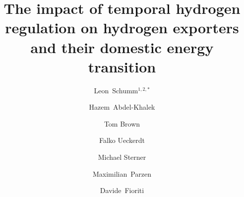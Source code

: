 \documentclass[5p,numafflabel]{elsarticle}
\begin{document}
\begin{frontmatter}

	\title{The impact of temporal hydrogen regulation on hydrogen exporters and their domestic energy transition}

    
    \author{Leon~Schumm${}^{1,2,*}$}
	\author[ieg,alu,oet]{Hazem~Abdel-Khalek}
	\author[tub]{Tom Brown}
	\author[pik]{Falko Ueckerdt}
	\author[oth]{Michael Sterner}
	\author[oet,uoe]{Maximilian~Parzen}
	\author[unipi]{Davide~Fioriti}

	\address[oth]{Research Center on Energy Transmission and Storage (FENES), Faculty of Electrical and Information Technology, University of Applied Sciences (OTH) Regensburg, Seybothstr. 2, 93053 Regensburg, Germany}
	\address[tub]{Department of Digital Transformation in Energy Systems, Technische Universität Berlin, Einsteinufer 25 (TA 8), 10587 Berlin, Germany}
	\address[ieg]{Fraunhofer Research Institution for Energy Infrastructures and Geothermal Systems IEG, Gulbener Straße 23, 03046 Cottbus, Germany}
	\address[alu]{Albert-Ludwigs Universität Freiburg, Faculty of Environment and Natural Resources, Tennenbacher Str. 4, 79106 Freiburg im Breisgau, Germany}
	\address[oet]{Open Energy Transition, Königsallee 52, 95448 Bayreuth, Germany}
	\address[pik]{Potsdam Institute for Climate Impact Research, Telegrafenberg, 14473 Potsdam, Germany}
	\address[uoe]{University of Edinburgh, Institute for Energy Systems, EH9 3DW Edinburgh, United Kingdom}
	\address[unipi]{University of Pisa, Department of Energy Systems, Territory and Construction Engineering, Largo Lucio Lazzarino, 56122 Pisa, Italy}

	\address{${}^{*}$ Corresponding author. Email: leon1.schumm@oth-regensburg.de}

	\begin{abstract}
		
	\end{abstract}





\end{frontmatter}

\end{document}
